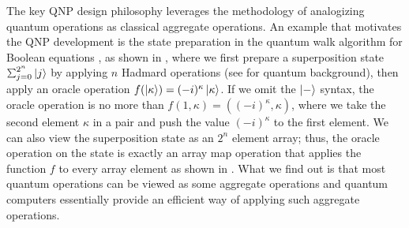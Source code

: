 
The key QNP design philosophy leverages the methodology of analogizing quantum operations as classical aggregate operations.
An example that motivates the QNP development is the state preparation in the quantum walk algorithm for Boolean equations \cite{ChildsNAND}, as shown in ,
where we first prepare a superposition state $\Msum_{j=0}^{2^n}\ket{j}$ by applying $n$ Hadmard operations (see  for quantum background), then apply an oracle operation $f(\left\vert{\kappa}\right\rangle)=(-i)^{\kappa}\left\vert{\kappa}\right\rangle$.
If we omit the $\left\vert{-}\right\rangle$ syntax, the oracle operation is no more than $f(1,\kappa)=((-i)^{\kappa},\kappa)$, where we take the second element $\kappa$ in a pair and push the value $(-i)^{\kappa}$ to the first element.
We can also view the superposition state as an $2^n$ element array; thus, the oracle operation on the state is exactly an array map operation that applies the function $f$ to every array element as shown in .
What we find out is that most quantum operations can be viewed as some aggregate operations and quantum computers essentially provide an efficient way of applying such aggregate operations.

